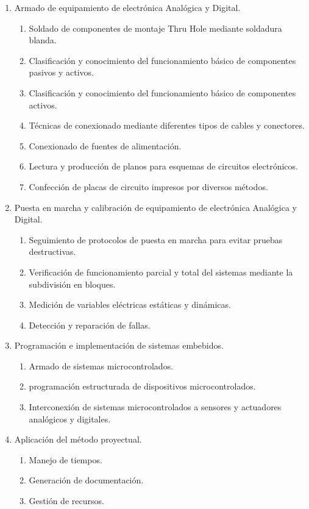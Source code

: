 \begin{enumerate}
	\item Armado de equipamiento de electrónica Analógica y Digital. \label{Exp1}
	\begin{enumerate}
		\item Soldado de componentes de montaje Thru Hole mediante soldadura blanda.
		\item Clasificación y conocimiento del funcionamiento básico de componentes pasivos y activos.
		\item Clasificación y conocimiento del funcionamiento básico de componentes activos.
		\item Técnicas de conexionado mediante diferentes tipos de cables y conectores.
		\item Conexionado de fuentes de alimentación.
		\item Lectura y producción de planos para esquemas de circuitos electrónicos.
		\item Confección de placas de circuito impresos por diversos métodos.
	\end{enumerate}
	\item Puesta en marcha y calibración de equipamiento de electrónica Analógica y Digital. \label{Exp2}
	\begin{enumerate}
		\item Seguimiento de protocolos de puesta en marcha para evitar pruebas destructivas.
		\item Verificación de funcionamiento parcial y total del sistemas mediante la subdivisión en bloques.
		\item Medición de variables eléctricas estáticas y dinámicas.
		\item Detección y reparación de fallas. 
	\end{enumerate}	 
	\item Programación e implementación de sistemas embebidos. \label{Exp3}
	\begin{enumerate}
		\item Armado de sistemas microcontrolados.
		\item programación estructurada de dispositivos microcontrolados.
		\item Interconexión de sistemas microcontrolados a sensores y actuadores analógicos y digitales.
	\end{enumerate}
	\item Aplicación del método proyectual. \label{Exp4}
	\begin{enumerate}
		\item Manejo de tiempos.
		\item Generación de documentación.
		\item Gestión de recursos.
	\end{enumerate}	
\end{enumerate} 